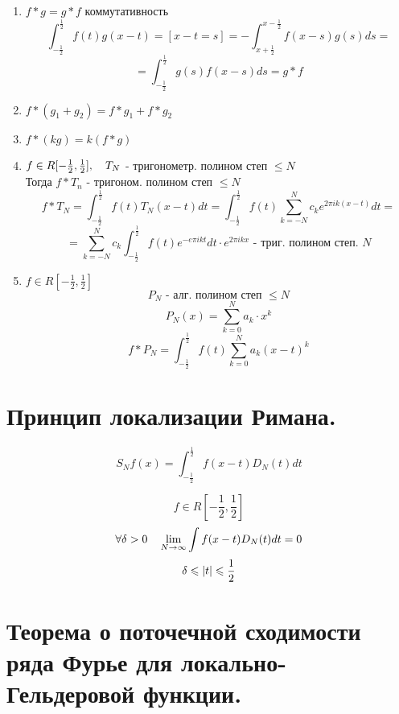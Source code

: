 \documentclass[matan, 12pt, fleqn]{subfiles}
\begin{document}
\begin{properties}
    \begin{enumerate}
        \item $f * g = g * f$ коммутативность
            \[\int_{-\frac{1}{2}}^{\frac{1}{2}} f(t)g(x - t) =
            \left[x - t = s\right] = - \int_{x + \frac{1}{2}}^{x - \frac{1}{2}} 
            f(x - s)g(s)ds = \]
            \[=\int_{-\frac{1}{2}}^{\frac{1}{2}} g(s)f(x - s)ds = g * f  \]
        \item $f * (g_1 + g_2) = f * g_1 + f * g_2$
        \item $f * (kg) = k(f * g)$
        \item $f \in R[-\frac{1}{2}, \frac{1}{2}], \quad T_N$ - тригонометр. полином
            степ $\leq N$\\
            Тогда $f * T_n$ - тригоном. полином степ $\leq N$
            \[f * T_N = \int_{-\frac{1}{2}}^{\frac{1}{2}} f(t)T_N(x - t)dt = 
            \int_{-\frac{1}{2}} ^{\frac{1}{2}} f(t)\sum_{k=-N}^N c_k 
            e^{2\pi i k (x -t)}dt  = \]
            \[=  \sum_{k = -N}^N c_k \int_{-\frac{1}{2}}^{\frac{1}{2}} f(t) 
            e^{-e\pi i kt}dt \cdot e^{2\pi ikx} \text{ - триг. полином степ. }N\]
        \item $f \in R[-\frac{1}{2}, \frac{1}{2}]$
            \[P_N \text{ - алг. полином степ } \leq N\]
            \[P_N(x) = \sum_{k = 0}^N a_k \cdot x^k \]
            \[f * P_N = \int_{-\frac{1}{2}}^{\frac{1}{2}}f(t) \sum_{k = 0}^N 
            a_k (x - t)^k  \]
    \end{enumerate}
\end{properties}
\newpage
\section{Принцип локализации Римана.}

\[S_N f(x) = \int_{-\frac{1}{2}}^{\frac{1}{2}} f(x - t)D_N(t)dt \]

\begin{Lemma}
    \[f \in R[-\frac{1}{2}, \frac{1}{2}]\]    
    \[\forall \delta > 0 \quad \lim_{N \to \infty} \int f(x - t)D_N(t)dt = 0 \]
    \[\delta \leqslant \left|t\right| \leqslant \frac{1}{2}\]
\end{Lemma}

\newpage
\section{Теорема о поточечной сходимости ряда Фурье для локально-Гельдеровой функции.}
\end{document}

